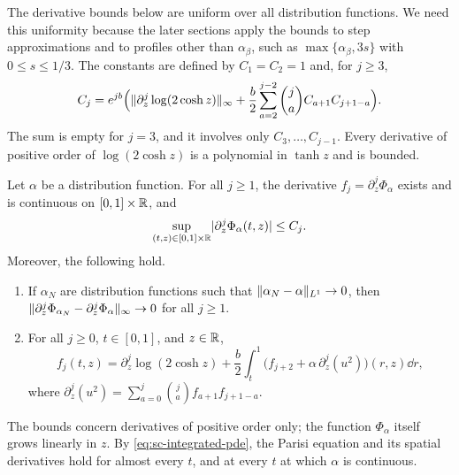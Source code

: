 The derivative bounds below are uniform over all distribution functions. We
need this uniformity because the later sections apply the bounds to step
approximations and to profiles other than $\alpha_\beta$, such as
$\max\{\alpha_\beta,3s\}$ with $0\le s\le1/3$. The constants are defined by $C_1=C_2=1$ and, for
$j\ge3$,
\begin{equation}\label{eq:sc-constants}
 C_j=e^{jb}\Bigl(\lVert \partial_z^j\log(2\cosh z)\rVert_\infty
   +\frac b2\sum_{a=2}^{j-2}\binom ja C_{a+1}C_{j+1-a}\Bigr).
\end{equation}
The sum is empty for $j=3$, and it involves only $C_3,\dots,C_{j-1}$. Every
derivative of positive order of $\log(2\cosh z)$ is a polynomial in
$\tanh z$ and is bounded.

\begin{lemma}\label{lem:sc-derivatives}
Let $\alpha$ be a distribution function. For all $j\ge1$, the derivative
$f_j=\partial_z^j\Phi_\alpha$ exists and is continuous on $[0,1]\times\mathbb R$,
and
\begin{equation}\label{eq:sc-derivative-bounds}
 \sup_{(t,z)\in[0,1]\times\mathbb R}\lvert \partial_z^j\Phi_\alpha(t,z)\rvert\le C_j.
\end{equation}
Moreover, the following hold.
\begin{enumerate}[label=\textup{(\roman*)}]
\item If $\alpha_N$ are distribution functions such that
  $\lVert \alpha_N-\alpha\rVert_{L^1}\to0$, then
  $\lVert \partial_z^j\Phi_{\alpha_N}-\partial_z^j\Phi_\alpha\rVert_\infty\to0$ for
  all $j\ge1$.
\item For all $j\ge0$, $t\in[0,1]$, and $z\in\mathbb R$,
  \begin{equation}\label{eq:sc-integrated-pde}
   f_j(t,z)=\partial_z^j\log(2\cosh z)
     +\frac b2\int_t^1\bigl(f_{j+2}+\alpha\,\partial_z^j(u^2)\bigr)(r,z)\dd r,
  \end{equation}
  where
  $\partial_z^j(u^2)=\sum_{a=0}^j\binom ja f_{a+1}f_{j+1-a}$.
\end{enumerate}
\end{lemma}

The bounds concern derivatives of positive order only; the function
$\Phi_\alpha$ itself grows linearly in $z$. By \eqref{eq:sc-integrated-pde},
the Parisi equation and its spatial derivatives hold for almost every $t$,
and at every $t$ at which $\alpha$ is continuous.

